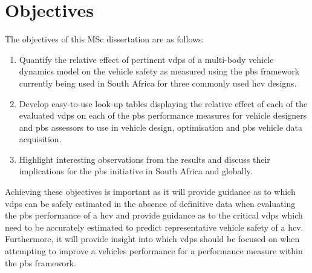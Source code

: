 \chapter{Objectives}\label{section:objectives}

The objectives of this MSc dissertation are as follows:

\begin{enumerate}
\item Quantify the relative effect of pertinent \glspl{vdp} of a multi-body vehicle dynamics model on the vehicle safety as measured using the \gls{pbs} framework currently being used in South Africa for three commonly used \gls{hcv} designs.
\item Develop easy-to-use look-up tables displaying the relative effect of each of the evaluated \glspl{vdp} on each of the \gls{pbs} performance measures for vehicle designers and \gls{pbs} assessors to use in vehicle design, optimisation and \gls{pbs} vehicle data acquisition.
\item Highlight interesting observations from the results and discuss their implications for the \gls{pbs} initiative in South Africa and globally.
\end{enumerate}

Achieving these objectives is important as it will provide guidance as to which \glspl{vdp} can be safely estimated in the absence of definitive data when evaluating the \gls{pbs} performance of a \gls{hcv} and provide guidance as to the critical \glspl{vdp} which need to be accurately estimated to predict representative vehicle safety of a \gls{hcv}. Furthermore, it will provide insight into which \glspl{vdp} should be focused on when attempting to improve a vehicles performance for a performance measure within the \gls{pbs} framework.